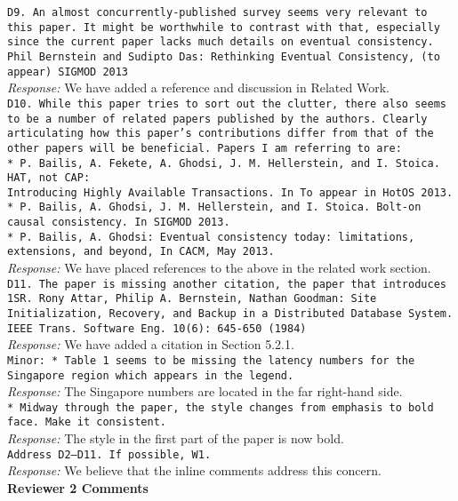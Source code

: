 \documentclass[10pt]{article}
\newcommand{\reviewer}[1] {\noindent\texttt{#1}\\}
\newcommand{\response}[1] {\noindent\textit{Response: } #1\\}
\begin{document}
\reviewer{D9. An almost concurrently-published survey seems very relevant to this paper. It might be worthwhile to contrast with that, especially since the current paper lacks much details on eventual consistency. Phil Bernstein and Sudipto Das: Rethinking Eventual Consistency, (to appear) SIGMOD 2013}

\response{We have added a reference and discussion in Related Work.}

\reviewer{D10. While this paper tries to sort out the clutter, there also seems to be a number of related papers published by the authors. Clearly articulating how this paper's contributions differ from that of the other papers will be beneficial. Papers I am referring to are: \\
* P. Bailis, A. Fekete, A. Ghodsi, J. M. Hellerstein, and I. Stoica. HAT, not CAP: \\
 Introducing Highly Available Transactions. In To appear in HotOS 2013.\\
* P. Bailis, A. Ghodsi, J. M. Hellerstein, and I. Stoica. Bolt-on causal consistency. In SIGMOD 2013. \\
* P. Bailis, A. Ghodsi: Eventual consistency today: limitations, extensions, and beyond, In CACM, May 2013.}

\response{We have placed references to the above in the related work section.}

\reviewer{D11. The paper is missing another citation, the paper that introduces 1SR. 
Rony Attar, Philip A. Bernstein, Nathan Goodman: Site Initialization, Recovery, and Backup in a Distributed Database System. IEEE Trans. Software Eng. 10(6): 645-650 (1984)}

\response{We have added a citation in Section 5.2.1.}

\reviewer{Minor: 
* Table 1 seems to be missing the latency numbers for the Singapore region which appears in the legend.}

\response{The Singapore numbers are located in the far right-hand side.}

\reviewer{* Midway through the paper, the style changes from emphasis to bold face. Make it consistent.}

\response{The style in the first part of the paper is now bold.}

\reviewer{Address D2--D11. If possible, W1.}

\response{We believe that the inline comments address this concern.}

\newpage
\noindent\textbf{Reviewer 2 Comments}\\
\end{document}
